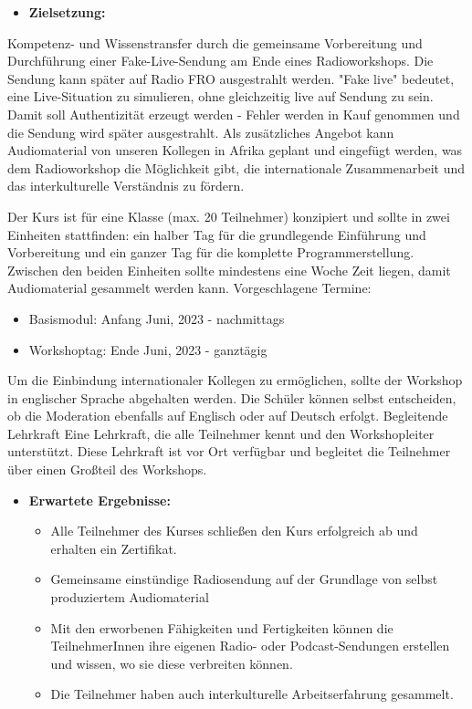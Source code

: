 \begin{itemize}
    \item \textbf{Zielsetzung:}
\end{itemize}

Kompetenz- und Wissenstransfer durch die 
gemeinsame Vorbereitung und Durchführung einer Fake-Live-Sendung am Ende eines Radioworkshops. Die Sendung kann später auf Radio FRO ausgestrahlt werden. "Fake live" bedeutet, eine Live-Situation zu simulieren, ohne gleichzeitig live auf Sendung zu sein. Damit soll Authentizität erzeugt werden - Fehler werden in Kauf genommen und die Sendung wird später ausgestrahlt. Als zusätzliches Angebot kann Audiomaterial von unseren Kollegen in Afrika geplant und eingefügt werden, was dem Radioworkshop die Möglichkeit gibt, die internationale Zusammenarbeit und das interkulturelle Verständnis zu fördern.

Der Kurs ist für eine Klasse (max. 20 Teilnehmer) konzipiert und sollte in zwei Einheiten stattfinden: ein halber Tag für die grundlegende Einführung und Vorbereitung und ein ganzer Tag für die komplette Programmerstellung. Zwischen den beiden Einheiten sollte mindestens eine Woche Zeit liegen, damit Audiomaterial gesammelt werden kann.
Vorgeschlagene Termine:

\begin{itemize}
    \item {Basismodul: Anfang Juni, 2023 - nachmittags}
    \item {Workshoptag: Ende Juni, 2023 - ganztägig}
\end{itemize}

Um die Einbindung internationaler Kollegen zu ermöglichen, sollte der Workshop in englischer Sprache abgehalten werden. Die Schüler können selbst entscheiden, ob die Moderation ebenfalls auf Englisch oder auf Deutsch erfolgt.
Begleitende Lehrkraft 
Eine Lehrkraft, die alle Teilnehmer kennt und den Workshopleiter unterstützt. Diese Lehrkraft ist vor Ort verfügbar und begleitet die Teilnehmer über einen Großteil des Workshops.

\begin{itemize}
    \item \textbf{Erwartete Ergebnisse:}
    \begin{itemize}
        \item {Alle Teilnehmer des Kurses schließen den Kurs erfolgreich ab und erhalten ein Zertifikat.}
        \item {Gemeinsame einstündige Radiosendung auf der Grundlage von selbst produziertem Audiomaterial}
        \item {Mit den erworbenen Fähigkeiten und Fertigkeiten können die TeilnehmerInnen ihre eigenen Radio- oder Podcast-Sendungen erstellen und wissen, wo sie diese verbreiten können.}
        \item {Die Teilnehmer haben auch interkulturelle Arbeitserfahrung gesammelt.}
    \end{itemize}
\end{itemize}

